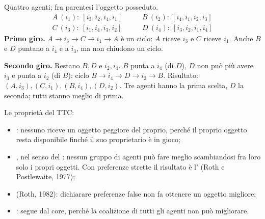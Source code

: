 \begin{esempio}
Quattro agenti; fra parentesi l'oggetto posseduto.
\[
\begin{array}{ll}
  A\ (i_1):\ [i_3, i_2, i_4, i_1] & \qquad B\ (i_2):\ [i_4, i_1, i_2, i_3] \\
  C\ (i_3):\ [i_1, i_4, i_3, i_2] & \qquad D\ (i_4):\ [i_3, i_2, i_1, i_4]
\end{array}
\]
\textbf{Primo giro.} $A \to i_3 \to C \to i_1 \to A$ è un ciclo: $A$ riceve $i_3$ e $C$
riceve $i_1$. Anche $B$ e $D$ puntano a $i_4$ e a $i_3$, ma non chiudono un ciclo.
\begin{center}
\end{center}
\textbf{Secondo giro.} Restano $B, D$ e $i_2, i_4$. $B$ punta a $i_4$ (di $D$), $D$ non
può più avere $i_3$ e punta a $i_2$ (di $B$): ciclo $B \to i_4 \to D \to i_2 \to B$.
Risultato: $(A, i_3), (C, i_1), (B, i_4), (D, i_2)$. Tre agenti hanno la prima scelta, $D$
la seconda; tutti stanno meglio di prima.
\end{esempio}

Le proprietà del TTC:
\begin{itemize}
  \item {}: nessuno riceve un oggetto peggiore del proprio,
        perché il proprio oggetto resta disponibile finché il suo proprietario è in gioco;
  \item {}, nel senso del : nessun gruppo di agenti può fare meglio
        scambiandosi fra loro solo i propri oggetti. Con preferenze strette il risultato è
        l' (Roth e Postlewaite, 1977);
  \item {} (Roth, 1982): dichiarare preferenze false non fa ottenere un
        oggetto migliore;
  \item {}: segue dal core, perché la coalizione di tutti gli agenti
        non può migliorare.
\end{itemize}

